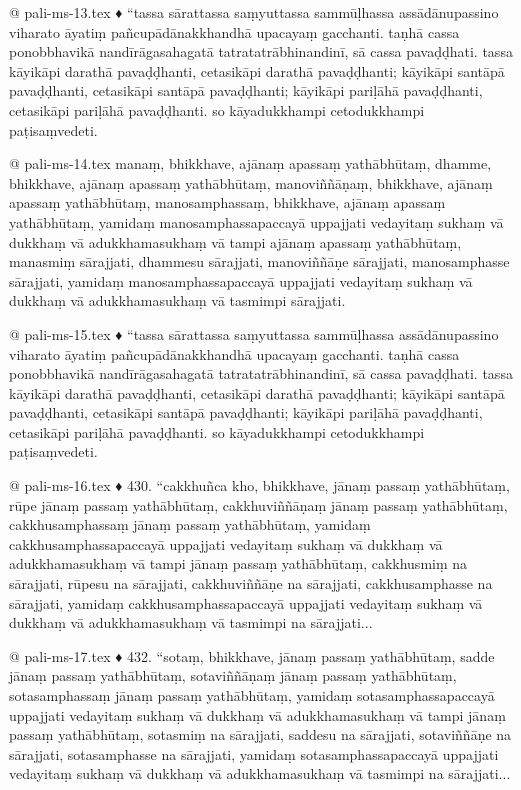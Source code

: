 @ pali-ms-13.tex
♦ “tassa sārattassa saṃyuttassa sammūḷhassa assādānupassino viharato āyatiṃ pañcupādānakkhandhā upacayaṃ gacchanti. taṇhā cassa ponobbhavikā nandīrāgasahagatā tatratatrābhinandinī, sā cassa pavaḍḍhati. tassa kāyikāpi darathā pavaḍḍhanti, cetasikāpi darathā pavaḍḍhanti; kāyikāpi santāpā pavaḍḍhanti, cetasikāpi santāpā pavaḍḍhanti; kāyikāpi pariḷāhā pavaḍḍhanti, cetasikāpi pariḷāhā pavaḍḍhanti. so kāyadukkhampi cetodukkhampi paṭisaṃvedeti.

@ pali-ms-14.tex
manaṃ, bhikkhave, ajānaṃ apassaṃ yathābhūtaṃ, dhamme, bhikkhave, ajānaṃ apassaṃ yathābhūtaṃ, manoviññāṇaṃ, bhikkhave, ajānaṃ apassaṃ yathābhūtaṃ, manosamphassaṃ, bhikkhave, ajānaṃ apassaṃ yathābhūtaṃ, yamidaṃ manosamphassapaccayā uppajjati vedayitaṃ sukhaṃ vā dukkhaṃ vā adukkhamasukhaṃ vā tampi ajānaṃ apassaṃ yathābhūtaṃ, manasmiṃ sārajjati, dhammesu sārajjati, manoviññāṇe sārajjati, manosamphasse sārajjati, yamidaṃ manosamphassapaccayā uppajjati vedayitaṃ sukhaṃ vā dukkhaṃ vā adukkhamasukhaṃ vā tasmimpi sārajjati.

@ pali-ms-15.tex
♦ “tassa sārattassa saṃyuttassa sammūḷhassa assādānupassino viharato āyatiṃ pañcupādānakkhandhā upacayaṃ gacchanti. taṇhā cassa ponobbhavikā nandīrāgasahagatā tatratatrābhinandinī, sā cassa pavaḍḍhati. tassa kāyikāpi darathā pavaḍḍhanti, cetasikāpi darathā pavaḍḍhanti; kāyikāpi santāpā pavaḍḍhanti, cetasikāpi santāpā pavaḍḍhanti; kāyikāpi pariḷāhā pavaḍḍhanti, cetasikāpi pariḷāhā pavaḍḍhanti. so kāyadukkhampi cetodukkhampi paṭisaṃvedeti.

@ pali-ms-16.tex
♦ 430. “cakkhuñca kho, bhikkhave, jānaṃ passaṃ yathābhūtaṃ, rūpe jānaṃ passaṃ yathābhūtaṃ, cakkhuviññāṇaṃ jānaṃ passaṃ yathābhūtaṃ, cakkhusamphassaṃ jānaṃ passaṃ yathābhūtaṃ, yamidaṃ cakkhusamphassapaccayā uppajjati vedayitaṃ sukhaṃ vā dukkhaṃ vā adukkhamasukhaṃ vā tampi jānaṃ passaṃ yathābhūtaṃ, cakkhusmiṃ na sārajjati, rūpesu na sārajjati, cakkhuviññāṇe na sārajjati, cakkhusamphasse na sārajjati, yamidaṃ cakkhusamphassapaccayā uppajjati vedayitaṃ sukhaṃ vā dukkhaṃ vā adukkhamasukhaṃ vā tasmimpi na sārajjati...

@ pali-ms-17.tex
	♦ 432. “sotaṃ, bhikkhave, jānaṃ passaṃ yathābhūtaṃ, sadde jānaṃ passaṃ yathābhūtaṃ, sotaviññāṇaṃ jānaṃ passaṃ yathābhūtaṃ, sotasamphassaṃ jānaṃ passaṃ yathābhūtaṃ, yamidaṃ sotasamphassapaccayā uppajjati vedayitaṃ sukhaṃ vā dukkhaṃ vā adukkhamasukhaṃ vā tampi jānaṃ passaṃ yathābhūtaṃ, sotasmiṃ na sārajjati, saddesu na sārajjati, sotaviññāṇe na sārajjati, sotasamphasse na sārajjati, yamidaṃ sotasamphassapaccayā uppajjati vedayitaṃ sukhaṃ vā dukkhaṃ vā adukkhamasukhaṃ vā tasmimpi na sārajjati...

